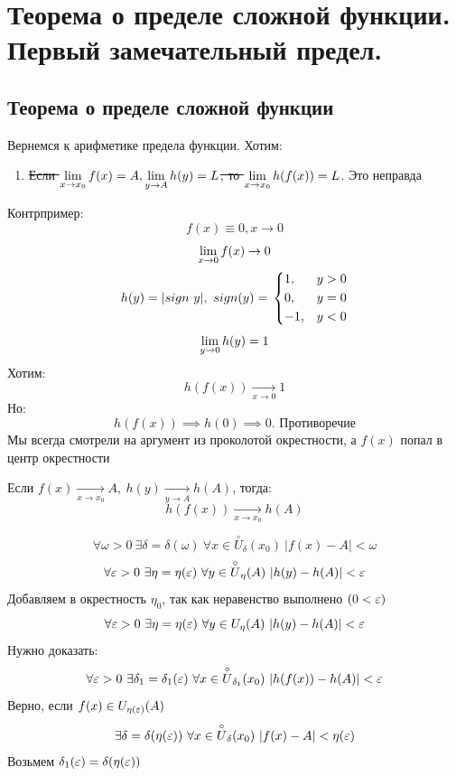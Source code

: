 \section{Теорема о пределе сложной функции. Первый замечательный предел.}

\subsection{Теорема о пределе сложной функции}

\begin{remark}
    Вернемся к арифметике предела функции. Хотим:

\begin{enumerate}
    \item[5.] \sout{Если $\lim\limits_{x \to x_0} f(x) = A, \lim\limits_{y \to A} h(y) = L$, то $\lim\limits_{x \to x_0} h(f(x)) = L$}. Это неправда
\end{enumerate}

Контрпример:
\[
    f(x) \equiv 0, x \to 0
\]
\[
    \lim\limits_{x \to 0} f(x) \to 0
\]
\[
    h(y) = |sign\ y|,\ sign(y) = \\
    \begin{dcases}
        1, &y > 0\\
        0, &y = 0\\
        -1, &y < 0
    \end{dcases}
\]
\[
    \lim\limits_{y \to 0} h(y) = 1
\]
Хотим: 
\[
    h(f(x)) \xrightarrow[x \to 0]{} 1
\]
Но: 
\[
    h(f(x)) \implies h(0) \implies 0 \text{. Противоречие}
\]
Мы всегда смотрели на аргумент из проколотой окрестности, а $f(x)$ попал в центр окрестности
\end{remark}

\begin{theorem}
    Если $f(x) \xrightarrow[x \to x_0]{} A,\ h(y) \xrightarrow[y \to A]{} h(A)$, тогда: 
    \[
        h(f(x)) \xrightarrow[x \to x_0]{} h(A)
    \]
\end{theorem}
\begin{Proof}
\[
    \forall \omega > 0\ \exists \delta = \delta (\omega )\ \forall x \in \overset{\circ}{U}_{\delta }(x_0)\ |f(x) - A| < \omega
\]
\[
    \forall \varepsilon > 0\ \exists \eta = \eta (\varepsilon )\ \forall y \in \overset{\circ}{U}_{\eta }(A)\ |h(y) - h(A)| < \varepsilon 
\]
Добавляем в окрестность $\eta_0$, так как неравенство выполнено $(0 < \varepsilon )$
\[
    \forall \varepsilon > 0\ \exists \eta = \eta (\varepsilon )\ \forall y \in {U}_{\eta }(A)\ |h(y) - h(A)| < \varepsilon 
\]
Нужно доказать: 
\[
    \forall \varepsilon > 0\ \exists \delta_1 = \delta_1(\varepsilon )\ \forall x \in \overset{\circ}{U}_{\delta_1}(x_0)\ |h(f(x)) - h(A)| < \varepsilon 
\]
Верно, если $f(x) \in U_{\eta (\varepsilon )}(A)$
\[
    \exists \delta = \delta (\eta (\varepsilon ))\ \forall x \in \overset{\circ}{U}_{\delta }(x_0)\ |f(x) - A| < \eta (\varepsilon )
\]
Возьмем $\delta_1(\varepsilon ) = \delta (\eta (\varepsilon ))$
\end{Proof}

